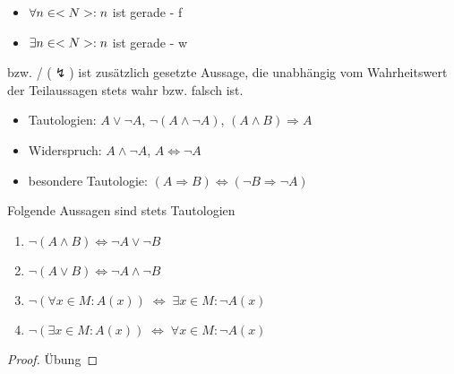 \begin{example}
	\begin{itemize}
		\item $\forall n\in<N>:n$ ist gerade - f
		\item $\exists n\in<N>:n$ ist gerade - w
	\end{itemize}
\end{example}

\begin{*definition}
	 bzw. \slash{} ($\lightning$) ist zusätzlich gesetzte Aussage, die unabhängig vom Wahrheitswert der Teilaussagen stets wahr bzw. falsch ist.
\end{*definition}

\begin{example}
	\begin{itemize}
		\item Tautologien: $A\lor\neg A$, $\neg(A\land\neg A)$, $(A\land B)\Rightarrow A$
		\item Widerspruch: $A\land\neg A$, $A\iff\neg A$
		\item besondere Tautologie: $(A\Rightarrow B)\iff (\neg B\Rightarrow \neg A)$
	\end{itemize}
\end{example}

\begin{proposition}
	Folgende Aussagen sind stets Tautologien
	\begin{enumerate}[label={\alph*)}]
		\item $\neg(A\land B) \Leftrightarrow \neg A \lor \neg B$
		\item $\neg(A\lor B) \Leftrightarrow \neg A\land \neg B$
		\item $\neg (\forall x\in M: A(x)) \;\Leftrightarrow \; \exists x\in M:\neg A(x)$
		\item $\neg (\exists x\in M: A(x)) \;\Leftrightarrow \;\forall x\in M:\neg A(x)$
	\end{enumerate}
\end{proposition}

\begin{proof}
	Übung
\end{proof}

